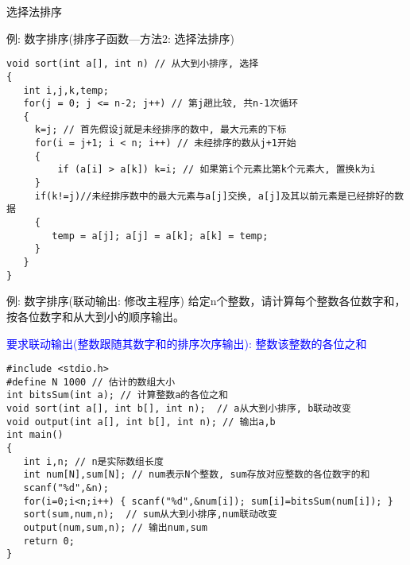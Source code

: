 \begin{frame}{选择法排序}
\end{frame}


\begin{frame}{例: 数字排序(排序子函数---方法2: 选择法排序)}
\vspace{-0.3cm}
\begin{lstlisting}
void sort(int a[], int n) // 从大到小排序, 选择
{
   int i,j,k,temp;
   for(j = 0; j <= n-2; j++) // 第j趟比较, 共n-1次循环
   {
     k=j; // 首先假设j就是未经排序的数中, 最大元素的下标
     for(i = j+1; i < n; i++) // 未经排序的数从j+1开始
     {
         if (a[i] > a[k]) k=i; // 如果第i个元素比第k个元素大, 置换k为i
     }
     if(k!=j)//未经排序数中的最大元素与a[j]交换, a[j]及其以前元素是已经排好的数据
     { 
        temp = a[j]; a[j] = a[k]; a[k] = temp; 
     }
   }
}
\end{lstlisting}
\end{frame}

\begin{frame}{例: 数字排序(联动输出: 修改主程序)}
给定n个整数，请计算每个整数各位数字和，按各位数字和从大到小的顺序输出。

\textcolor{blue}{要求联动输出(整数跟随其数字和的排序次序输出): 整数\quad 该整数的各位之和}
\begin{lstlisting}
#include <stdio.h>
#define N 1000 // 估计的数组大小
int bitsSum(int a); // 计算整数a的各位之和
void sort(int a[], int b[], int n);  // a从大到小排序, b联动改变
void output(int a[], int b[], int n); // 输出a,b
int main()
{
   int i,n; // n是实际数组长度 
   int num[N],sum[N]; // num表示N个整数, sum存放对应整数的各位数字的和  
   scanf("%d",&n);
   for(i=0;i<n;i++) { scanf("%d",&num[i]); sum[i]=bitsSum(num[i]); }
   sort(sum,num,n);  // sum从大到小排序,num联动改变
   output(num,sum,n); // 输出num,sum
   return 0;
}
\end{lstlisting}
\end{frame}

